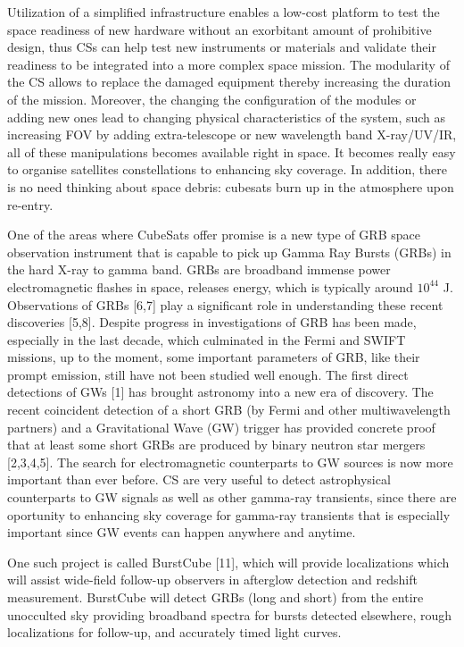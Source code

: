 Utilization of a simplified infrastructure enables a low-cost platform to test the space readiness of new hardware without an exorbitant amount of prohibitive design, thus
CSs can help test new instruments or materials and validate their readiness to be integrated into a more complex space mission.
The modularity of the CS allows to replace the damaged equipment thereby increasing the duration of the mission.
Moreover, the changing the configuration of the modules or adding new ones lead to changing physical characteristics of the system,
such as increasing FOV by adding extra-telescope or new wavelength band X-ray/UV/IR, all of these manipulations becomes available right in space.
It becomes really easy to organise satellites constellations to enhancing sky coverage.
In addition, there is no need thinking about space debris: cubesats burn up in the atmosphere upon re-entry.

One of the areas where CubeSats offer promise is a new type of GRB space observation instrument that is capable to pick up Gamma Ray Bursts (GRBs) in the hard X-ray to gamma band.
GRBs are broadband immense power electromagnetic flashes in space, releases energy, which is typically around $10^{44}$ J.
Observations of GRBs [6,7] play a significant role in understanding these recent discoveries [5,8].
Despite progress in investigations of GRB has been made, especially in the last decade, which culminated in the Fermi and SWIFT missions, up to the moment, some important parameters of GRB, like their prompt emission, still have not been studied well enough. 
The first direct detections of GWs [1] has brought astronomy into a new era of discovery.
The recent coincident detection of a short GRB (by Fermi and other multiwavelength partners) and a Gravitational Wave (GW) trigger has provided concrete proof that at least some short GRBs are produced by binary neutron star mergers [2,3,4,5]. The search for electromagnetic counterparts to GW sources is now more important than ever before.
CS are very useful to detect astrophysical counterparts to GW signals as well as other gamma-ray transients,
since there are oportunity to enhancing sky coverage for gamma-ray transients that is especially important since GW events can happen anywhere and anytime.

One such project is called BurstCube [11], which will provide localizations which will assist wide-field follow-up observers in afterglow detection and redshift measurement.
BurstCube will detect GRBs (long and short) from the entire unocculted sky providing broadband spectra for bursts detected elsewhere, rough localizations for follow-up, and accurately timed light curves.


